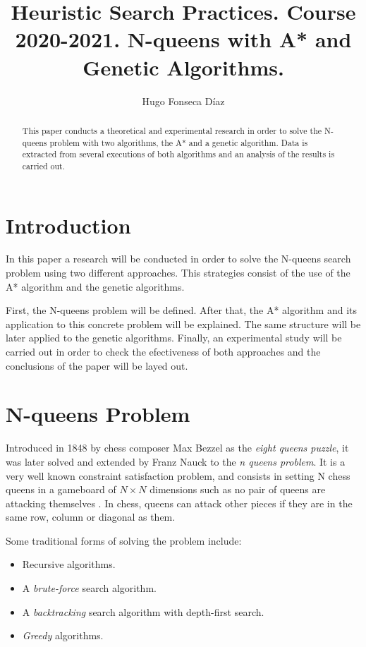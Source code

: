 \documentclass[11pt]{llncs}
\begin{document}
\title{Heuristic Search Practices. Course 2020-2021. N-queens with A* and Genetic Algorithms.}
\author{Hugo Fonseca Díaz\\ }
\maketitle
\begin{abstract}
This paper conducts a theoretical and experimental research in order to solve the N-queens problem with two algorithms, the A* and a genetic algorithm. Data is extracted from several executions of both algorithms and an analysis of the results is carried out.
\end{abstract}
\section{Introduction}\label{introduction}
In this paper a research will be conducted in order to solve the N-queens search problem using two different approaches. This strategies consist of the use of the A* algorithm and the genetic algorithms.

First, the N-queens problem will be defined. After that, the A* algorithm and its application to this concrete problem will be explained. The same structure will be later applied to the genetic algorithms. Finally, an experimental study will be carried out in order to check the efectiveness of both approaches and the conclusions of the paper will be layed out.
\section{N-queens Problem}\label{nqueens_problem}
Introduced in 1848 by chess composer Max Bezzel as the \textit{eight queens puzzle}, it was later solved and extended by Franz Nauck to the \textit{n queens problem}. It is a very well known constraint satisfaction problem, and consists in setting N chess queens in a gameboard of $N \times N$ dimensions such as no pair of queens are attacking themselves \cite{inteligencia_artificial}. In chess, queens can attack other pieces if they are in the same row, column or diagonal as them.

Some traditional forms of solving the problem include:
\begin{itemize}
    \item Recursive algorithms.
    \item A \textit{brute-force} search algorithm.
    \item A \textit{backtracking} search algorithm with depth-first search.
    \item \textit{Greedy} algorithms.
\end{itemize}
\end{document}
